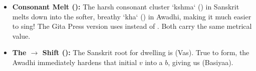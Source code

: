 \begin{tcolorbox}[gotchabox]
\begin{itemize}
    \item \textbf{Consonant Melt ():} The harsh consonant cluster `kshma` () in Sanskrit melts down into the softer, breathy `kha` () in Awadhi, making it much easier to sing! The Gita Press version uses  instead of . Both carry the same metrical value.
    \item \textbf{The  $\rightarrow$  Shift ():} The Sanskrit root for dwelling is  (Vas). True to form, the Awadhi immediately hardens that initial $v$ into a $b$, giving us  (Basiyaa).
    
\end{itemize}
\end{tcolorbox}



\newpage
